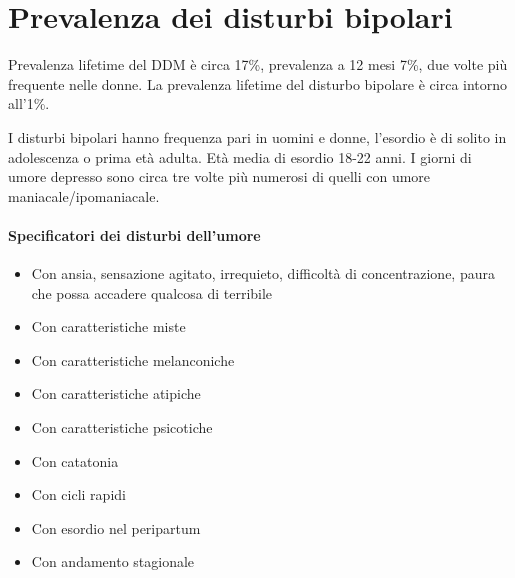 
\section{Prevalenza dei disturbi bipolari}

Prevalenza lifetime del DDM è circa 17\%, prevalenza a 12 mesi 7\%, due volte più frequente nelle donne. La prevalenza lifetime del disturbo bipolare è circa intorno all'1\%.

I disturbi bipolari hanno frequenza pari in uomini e donne, l'esordio è di solito in adolescenza o prima età adulta. Età media di esordio 18-22 anni. I giorni di umore depresso sono circa tre volte più numerosi di quelli con umore maniacale/ipomaniacale.

\paragraph{Specificatori dei disturbi dell'umore}
\begin{itemize}
	\item Con ansia, sensazione agitato, irrequieto, difficoltà di concentrazione, paura che possa accadere qualcosa di terribile
	\item Con caratteristiche miste
	\item Con caratteristiche melanconiche
	\item Con caratteristiche atipiche
	\item Con caratteristiche psicotiche 
	\item Con catatonia
	\item Con cicli rapidi
	\item Con esordio nel peripartum
	\item Con andamento stagionale
\end{itemize}


